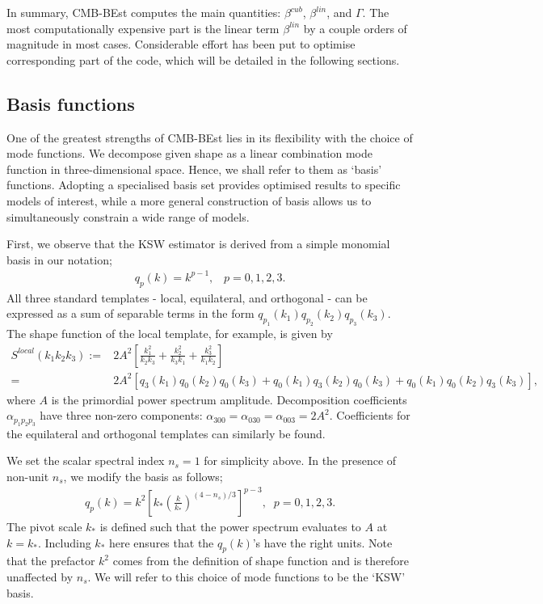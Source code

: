 In summary, CMB-BEst computes the main quantities: $\beta^{cub}$, $\beta^{lin}$, and $\Gamma$. The most computationally expensive part is the linear term $\beta^{lin}$ by a couple orders of magnitude in most cases. Considerable effort has been put to optimise corresponding part of the code, which will be detailed in the following sections.

\subsection{Basis functions} \label{section:basis_functions}

One of the greatest strengths of CMB-BEst lies in its flexibility with the choice of mode functions. We decompose given shape as a linear combination mode function in three-dimensional space. Hence, we shall refer to them as `basis' functions. Adopting a specialised basis set provides optimised results to specific models of interest, while a more general construction of basis allows us to simultaneously constrain a wide range of models.

First, we observe that the KSW estimator \cite{Komatsu2005} is derived from a simple monomial basis in our notation;
\begin{align}
	q_p(k) = k^{p-1}, \;\;\; p = 0, 1, 2, 3.
\end{align}
All three standard templates - local, equilateral, and orthogonal - can be expressed as a sum of separable terms in the form $q_{p_1}(k_1) q_{p_2}(k_2) q_{p_3}(k_3)$. The shape function of the local template, for example, is given by
\begin{align}
	S^{local}(k_1 k_2 k_3) :=& 2A^2 \left[ \frac{k_1^2}{k_2 k_3} + \frac{k_2^2}{k_3 k_1} + \frac{k_3^2}{k_1 k_2}  \right] \\
	=& 2A^2 \left[q_3(k_1)q_0(k_2)q_0(k_3) + q_0(k_1)q_3(k_2)q_0(k_3) + q_0(k_1)q_0(k_2)q_3(k_3) \right],
\end{align}
where $A$ is the primordial power spectrum amplitude. Decomposition coefficients $\alpha_{p_1 p_2 p_3}$ have three non-zero components: $\alpha_{300} = \alpha_{030} = \alpha_{003} = 2A^2$. Coefficients for the equilateral and orthogonal templates can similarly be found.

We set the scalar spectral index $n_s = 1$ for simplicity above. In the presence of non-unit $n_s$, we modify the basis as follows;
\begin{align}
	q_p(k) = k^2 \left[ k_* \left( \frac{k}{k_*} \right)^{(4-n_s)/3} \right]^{p-3}, \;\; p=0,1,2,3. \label{eqn:KSW_basis}
\end{align}
The pivot scale $k_*$ is defined such that the power spectrum evaluates to $A$ at $k=k_*$. Including $k_*$ here ensures that the $q_p(k)$'s have the right units. Note that the prefactor $k^2$ comes from the definition of shape function and is therefore unaffected by $n_s$. We will refer to this choice of mode functions to be the `KSW' basis.

